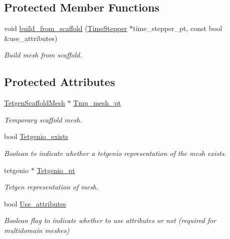 \subsection*{Protected Member Functions}
\begin{DoxyCompactItemize}
\item 
void \hyperlink{classoomph_1_1TetgenMesh_a3b0d214cb14243f7ecc2c82e6641930b}{build\+\_\+from\+\_\+scaffold} (\hyperlink{classoomph_1_1TimeStepper}{Time\+Stepper} $\ast$time\+\_\+stepper\+\_\+pt, const bool \&use\+\_\+attributes)
\begin{DoxyCompactList}\small\item\em Build mesh from scaffold. \end{DoxyCompactList}\end{DoxyCompactItemize}
\subsection*{Protected Attributes}
\begin{DoxyCompactItemize}
\item 
\hyperlink{classoomph_1_1TetgenScaffoldMesh}{Tetgen\+Scaffold\+Mesh} $\ast$ \hyperlink{classoomph_1_1TetgenMesh_ac11e90fcf927bbf8317800db7723bad2}{Tmp\+\_\+mesh\+\_\+pt}
\begin{DoxyCompactList}\small\item\em Temporary scaffold mesh. \end{DoxyCompactList}\item 
bool \hyperlink{classoomph_1_1TetgenMesh_ab9aa31216620790d084d133b8781be37}{Tetgenio\+\_\+exists}
\begin{DoxyCompactList}\small\item\em Boolean to indicate whether a tetgenio representation of the mesh exists. \end{DoxyCompactList}\item 
tetgenio $\ast$ \hyperlink{classoomph_1_1TetgenMesh_a508672e33aa773da58c834a526cb5c59}{Tetgenio\+\_\+pt}
\begin{DoxyCompactList}\small\item\em Tetgen representation of mesh. \end{DoxyCompactList}\item 
bool \hyperlink{classoomph_1_1TetgenMesh_a94c4ac3940ecfdd87679167d300ce75d}{Use\+\_\+attributes}
\begin{DoxyCompactList}\small\item\em Boolean flag to indicate whether to use attributes or not (required for multidomain meshes) \end{DoxyCompactList}\end{DoxyCompactItemize}
